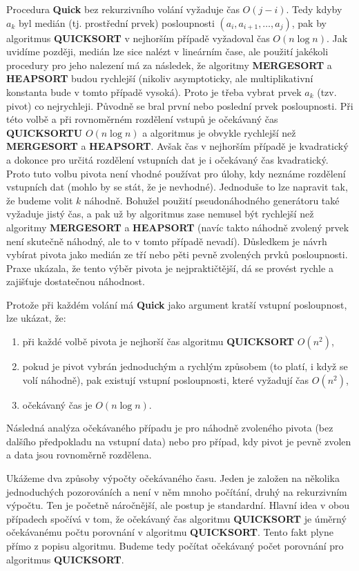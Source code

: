 \documentclass[a4paper,12pt]{article}
\begin{document}
Procedura {\bf Quick} bez rekurzivního volání 
vyžaduje čas $O(j-i)$. Tedy kdyby $a_k$ byl medián (tj. 
prostřední prvek) posloupnosti $(a_i,a_{i+1},\dots,a_j)$, pak 
by algoritmus {\bf QUICKSORT} v nejhorším případě vy\-žadoval čas $
O(n\log n)$. Jak 
uvidíme později, medián lze sice nalézt v lineár\-ním čase, ale 
použití jakékoli procedury pro jeho nalezení má za 
následek, že algoritmy {\bf MERGESORT} a {\bf HEAPSORT }
budou rychlejší (nikoliv asymptoticky, ale 
multiplikativní konstanta bude v tomto případě vysoká). Proto je třeba 
vybrat prvek $a_k$ (tzv. pivot) co 
nejrychleji. Původně se bral první nebo 
poslední prvek posloupnosti. Při této volbě a při 
rovnoměrném rozdělení vstupů je 
očekávaný čas {\bf QUICKSORTU} $O(n\log n)$ a algoritmus je 
obvykle rychlejší než {\bf MERGESORT} a 
{\bf HEAPSORT}. Avšak čas v nejhorším případě je 
kvadratický a dokonce pro určitá rozdělení vstupních dat 
je i očekávaný čas kvadratický. 
Proto tuto volbu pivota není vhodné používat pro úlohy, kdy 
neznáme rozdělení vstupních dat (mohlo by se stát, že je 
nevhodné). Jednoduše to lze napravit tak, že budeme volit $
k$ náhodně. Bohužel 
použití pseudonáhodného generátoru také vyžaduje jistý čas, a pak 
už by algoritmus zase nemusel být rychlejší než algoritmy 
{\bf MERGESORT} a {\bf HEAPSORT} (navíc takto náhodně zvolený 
prvek není skutečně náhodný, ale to v tomto případě 
nevadí). Důsledkem je návrh vybírat pivota jako 
medián ze tří nebo pěti pevně zvolených prvků 
posloupnosti. Praxe ukázala, že tento výběr pivota je 
nej\-praktičtější, dá se provést rychle a zajišťuje 
dostatečnou ná\-hod\-nost.

Protože při každém volání má {\bf Quick} jako 
argument kratší 
vstupní posloupnost, lze ukázat, že:
\begin{enumerate}
\item{}při každé volbě 
pivota je nejhorší čas algoritmu {\bf QUICKSORT} $O(n^2
)$,
\item{}pokud je pivot vybrán jedno\-du\-chým a rychlým 
způsobem (to platí, i když se volí náhodně), pak 
exi\-stují vstupní posloupnosti, které vyžadují čas $
O(n^2)$,
\item{}očekávaný čas je $O(n\log n)$.
\end{enumerate}

Následná analý\-za očekávaného případu  
je pro ná\-hod\-ně zvoleného pivota (bez dalšího před\-pokladu na 
vstupní data) nebo pro případ, kdy pivot je pevně zvolen a data jsou 
rovno\-měrně rozdě\-lena.

Ukážeme dva způsoby výpočty očekávaného času.  Jeden 
je založen na několika jednoduchých pozorováních a není v 
něm mnoho počítání, druhý na rekurzivním výpočtu. Ten 
je početně náročnější, ale postup je standardní. Hlavní idea v obou 
případech spočívá v tom, že  
očekávaný čas algoritmu {\bf QUICKSORT} je úměrný 
očekávanému počtu porovnání v algoritmu {\bf QUICKSORT}.
Tento fakt plyne přímo z popisu algoritmu.  Budeme 
tedy počítat  
očeká\-vaný počet porovnání pro algoritmus {\bf QUICKSORT}.  
\end{document}
